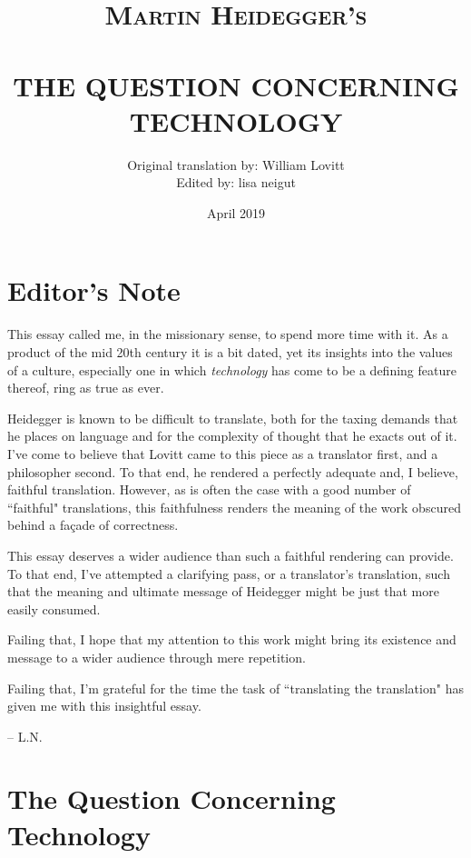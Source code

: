 \documentclass[paper=a4, fontsize=11pt,twoside]{scrartcl}
\title{	\normalsize \textsc{Martin Heidegger's} 
		 	\\[.5cm]								%
			\HRule{0.5pt} \\						%
			\LARGE \textbf{\uppercase{The Question Concerning Technology}}	%
			\HRule{2pt} \\ [0.5cm]		%
		}
\author{
		Original translation by: William Lovitt\\	
		Edited by: lisa neigut\\
}
\date{April 2019}
\makeatletter
\def\printtitle{%
    {\centering \@title\par}}
\def\printauthor{%
    {\centering \large \@author}}
\makeatother
\begin{document}
\thispagestyle{empty}		%

\printtitle					%
  	\vfill
\printauthor				%
\newpage
\setcounter{page}{1}		%
\section*{Editor's Note}

\vspace{3.0cm}
This essay called me, in the missionary sense, to spend more time with it. As a product of the mid 20th century it is a bit dated, yet its insights into the values of a culture, especially one in which \textit{technology} has come to be a defining feature thereof, ring as true as ever.

Heidegger is known to be difficult to translate, both for the taxing demands that he places on language and for the complexity of thought that he exacts out of it.  I've come to believe that Lovitt came to this piece as a translator first, and a philosopher second. To that end, he rendered a perfectly adequate and, I believe, faithful translation. However, as is often the case with a good number of ``faithful" translations, this faithfulness renders the meaning of the work obscured behind a fa\c{c}ade of correctness.

This essay deserves a wider audience than such a faithful rendering can provide. To that end, I've attempted a clarifying pass, or a translator's translation, such that the meaning and ultimate message of Heidegger might be just that more easily consumed.

Failing that, I hope that my attention to this work might bring its existence and message to a wider audience through mere repetition.

Failing that, I'm grateful for the time the task of ``translating the translation" has given me with this insightful essay.

\begin{flushright}
-- L.N.
\end{flushright}

\vfill
\section*{The Question Concerning Technology}
\end{document}
